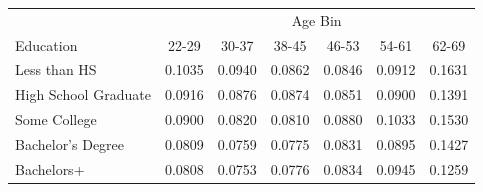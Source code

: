 \begin{tabular}{lcccccc}
\hline\hline
 & \multicolumn{6}{c}{Age Bin} \\
Education & 22-29 & 30-37 & 38-45 & 46-53 & 54-61 & 62-69 \\
\hline
Less than HS&0.1035&0.0940&0.0862&0.0846&0.0912&0.1631\\
High School Graduate&0.0916&0.0876&0.0874&0.0851&0.0900&0.1391\\
Some College&0.0900&0.0820&0.0810&0.0880&0.1033&0.1530\\
Bachelor's Degree&0.0809&0.0759&0.0775&0.0831&0.0895&0.1427\\
Bachelors+&0.0808&0.0753&0.0776&0.0834&0.0945&0.1259\\
\hline\hline
\end{tabular}
